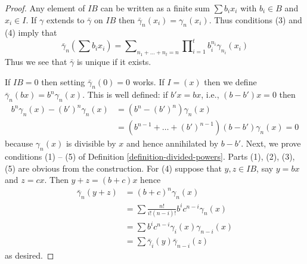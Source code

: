 \begin{proof}
Any element of $IB$ can be written as a finite sum $\sum b_ix_i$ with
$b_i \in B$ and $x_i \in I$. If $\gamma$ extends to $\bar\gamma$ on $IB$
then $\bar\gamma_n(x_i) = \gamma_n(x_i)$.
Thus conditions (3) and (4) imply that
$$
\bar\gamma_n(\sum b_ix_i) =
\sum\nolimits_{n_1 + \ldots + n_t = n}
\prod\nolimits_{i = 1}^t b_i^{n_i}\gamma_{n_i}(x_i)
$$
Thus we see that $\bar\gamma$ is unique if it exists.

\medskip\noindent
If $IB = 0$ then setting $\bar\gamma_n(0) = 0$ works. If $I = (x)$
then we define $\bar\gamma_n(bx) = b^n\gamma_n(x)$. This is well defined:
if $b'x = bx$, i.e., $(b - b')x = 0$ then
\begin{align*}
b^n\gamma_n(x) - (b')^n\gamma_n(x)
& =
(b^n - (b')^n)\gamma_n(x) \\
& =
(b^{n - 1} + \ldots + (b')^{n - 1})(b - b')\gamma_n(x) = 0
\end{align*}
because $\gamma_n(x)$ is divisible by $x$ and hence annihilated by $b - b'$.
Next, we prove conditions (1) -- (5) of
Definition \ref{definition-divided-powers}.
Parts (1), (2), (3), (5) are obvious from the construction.
For (4) suppose that $y, z \in IB$, say $y = bx$ and $z = cx$. Then
$y + z = (b + c)x$ hence
\begin{align*}
\bar\gamma_n(y + z)
& =
(b + c)^n\gamma_n(x) \\
& =
\sum \frac{n!}{i!(n - i)!}b^ic^{n -i}\gamma_n(x) \\
& =
\sum b^ic^{n - i}\gamma_i(x)\gamma_{n - i}(x) \\
& =
\sum \bar\gamma_i(y)\bar\gamma_{n -i}(z)
\end{align*}
as desired.


\end{proof}
